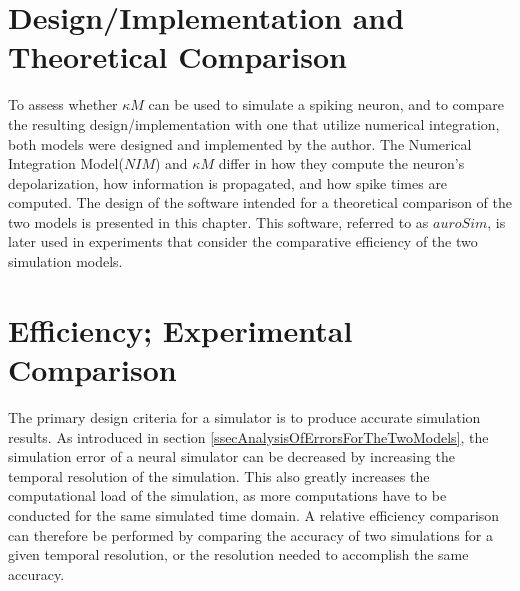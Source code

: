 \documentclass[b5paper,12 pt]{report}
\begin{document}
	




	\chapter{Design/Implementation and Theoretical Comparison} %
	\label{chDesignAndTheroeticalComparison}

		To assess whether $\kappa M$ can be used to simulate a spiking neuron, and to compare the resulting design/implementation with one that utilize numerical integration,
			both models were designed and implemented by the author. 
		The Numerical Integration Model($NIM$) and $\kappa M$ differ in how they compute the neuron's depolarization, how information is propagated, and how spike times are computed.
		The design of the software intended for a theoretical comparison of the two models is presented in this chapter.
 		This software, referred to as $auroSim$, is later used in experiments that consider the comparative efficiency of the two simulation models.

		
		



	
	\chapter{Efficiency; Experimental Comparison} %
	\label{chExperimentalEfficiencyMeasurement}
		The primary design criteria for a simulator is to produce accurate simulation results.
		As introduced in section \ref{ssecAnalysisOfErrorsForTheTwoModels}, the simulation error of a neural simulator can be decreased by increasing the temporal resolution of the simulation.
		This also greatly increases the computational load of the simulation, as more computations have to be conducted for the same simulated time domain.
		A relative efficiency comparison can therefore be performed by comparing the accuracy of two simulations for a given temporal resolution, or the resolution needed to accomplish the same accuracy.
\end{document}
